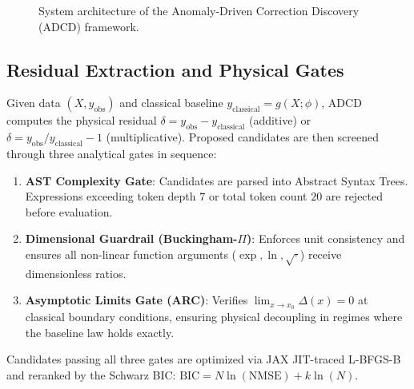 \documentclass{article}
\begin{document}
\begin{figure}[h!]
{
}
\caption{System architecture of the Anomaly-Driven Correction Discovery (ADCD) framework.}
\label{fig:architecture}
\end{figure}

\subsection{Residual Extraction and Physical Gates}
Given data $(X, y_{\text{obs}})$ and classical baseline $y_{\text{classical}} = g(X; \phi)$, ADCD computes the physical residual $\delta = y_{\text{obs}} - y_{\text{classical}}$ (additive) or $\delta = y_{\text{obs}}/y_{\text{classical}} - 1$ (multiplicative). Proposed candidates are then screened through three analytical gates in sequence:
\begin{enumerate}[leftmargin=*]
    \item \textbf{AST Complexity Gate}: Candidates are parsed into Abstract Syntax Trees. Expressions exceeding token depth $7$ or total token count $20$ are rejected before evaluation.
    \item \textbf{Dimensional Guardrail (Buckingham-$\Pi$)}: Enforces unit consistency and ensures all non-linear function arguments ($\exp, \ln, \sqrt{\cdot}$) receive dimensionless ratios.
    \item \textbf{Asymptotic Limits Gate (ARC)}: Verifies $\lim_{x \to x_0} \Delta(x) = 0$ at classical boundary conditions, ensuring physical decoupling in regimes where the baseline law holds exactly.
\end{enumerate}
Candidates passing all three gates are optimized via JAX JIT-traced L-BFGS-B and reranked by the Schwarz BIC: $\text{BIC} = N \ln(\text{NMSE}) + k \ln(N)$.
\end{document}
